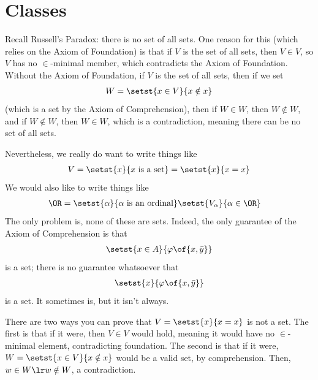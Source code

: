 \section{Classes}

Recall Russell's Paradox: there is no set of all sets. One reason for this (which relies on the Axiom of Foundation) is that if $V$ is the set of all sets, then $V \in V$, so $V$ has no $\in$-minimal member, which contradicts the Axiom of Foundation. Without the Axiom of Foundation, if $V$ is the set of all sets, then if we set
\begin{align*}
    W = \setst{x \in V}{x \notin x}
\end{align*}
(which is a set by the Axiom of Comprehension), then if $W \in W$, then $W \notin W$, and if $W \notin W$, then $W \in W$, which is a contradiction, meaning there can be no set of all sets.

Nevertheless, we really do want to write things like
\begin{align*}
    V = \setst{x}{x \text{ is a set}} = \setst{x}{x = x}
\end{align*}
We would also like to write things like
\begin{align*}
    \OR &= \setst{\alpha}{\alpha \text{ is an ordinal}} 
    \setst{V_{\alpha}}{\alpha \in \OR}
\end{align*}
The only problem is, none of these are sets. Indeed, the only guarantee of the Axiom of Comprehension is that
\begin{align*}
    \setst{x \in A}{\varphi\of{x, \bar{y}}}
\end{align*}
is a set; there is no guarantee whatsoever that
\begin{align*}
    \setst{x}{\varphi\of{x, \bar{y}}}
\end{align*}
is a set. It sometimes is, but it isn't always.

There are two ways you can prove that $V = \setst{x}{x = x}$ is not a set. The first is that if it were, then $V \in V$ would hold, meaning it would have no $\in$-minimal element, contradicting foundation. The second is that if it were, $W = \setst{x \in V}{x \notin x}$ would be a valid set, by comprehension. Then, $w \in W \lr w \notin W$, a contradiction.

